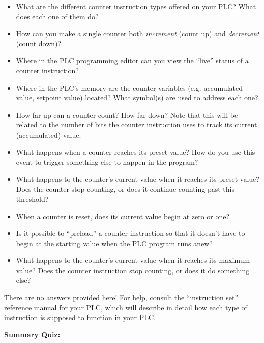 \begin{itemize}
\item{} What are the different counter instruction types offered on your PLC?  What does each one of them do?
\item{} How can you make a single counter both {\it increment} (count up) and {\it decrement} (count down)?
\item{} Where in the PLC programming editor can you view the ``live'' status of a counter instruction?
\item{} Where in the PLC's memory are the counter variables (e.g. accumulated value, setpoint value) located?  What symbol(s) are used to address each one?
\item{} How far up can a counter count?  How far down?  Note that this will be related to the number of bits the counter instruction uses to track its current (accumulated) value.
\item{} What happens when a counter reaches its preset value?  How do you use this event to trigger something else to happen in the program?
\item{} What happens to the counter's current value when it reaches its preset value?  Does the counter stop counting, or does it continue counting past this threshold?
\item{} When a counter is reset, does its current value begin at zero or one?
\item{} Is it possible to ``preload'' a counter instruction so that it doesn't have to begin at the starting value when the PLC program runs anew?
\item{} What happens to the counter's current value when it reaches its maximum value?  Does the counter instruction stop counting, or does it do something else?
\end{itemize}







There are no answers provided here!  For help, consult the ``instruction set'' reference manual for your PLC, which will describe in detail how each type of instruction is supposed to function in your PLC.
 






\noindent
{\bf Summary Quiz:}

